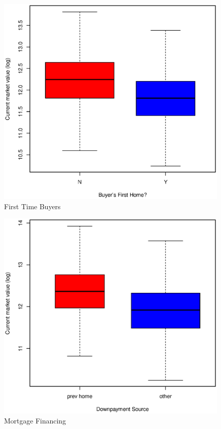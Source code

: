 \documentclass[11pt, fleqn]{article}
\begin{document}
\begin{figure}[!htb]
  \centering
  \includegraphics[scale=.5]{frstho.eps}
  \caption{First Time Buyers}
  \label{fig:frstho}
\end{figure}

\begin{figure}[!htb]
  \centering
  \includegraphics[scale=.5]{dwnpay.eps}
  \caption{Mortgage Financing}
  \label{fig:dwnpay}
\end{figure}
\end{document}
